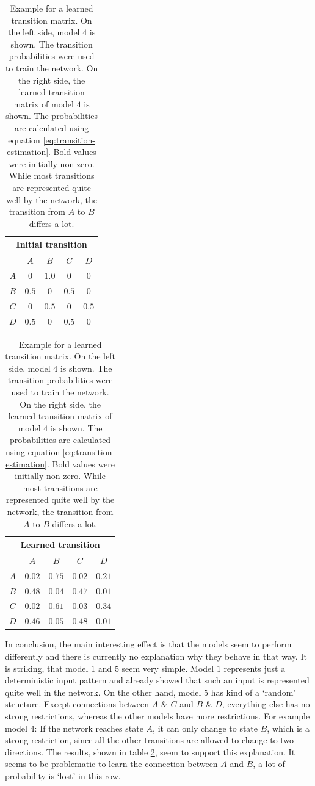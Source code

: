 \begin{table}[!b]
\centering
\begin{tabular}{ccccc}
\multicolumn{5}{c}{Initial transition} \\
\hline
& $A$ & $B$ & $C$ & $D$\\
$A$ & $0$ & $1.0$ & $0$ & $0$ \\
$B$ & $0.5$ & $0$ & $0.5$ & $0$ \\
$C$ & $0$ & $0.5$ & $0$ & $0.5$ \\
$D$ & $0.5$ & $0$ & $0.5$ & $0$
\end{tabular}
\qquad
\begin{tabular}{ccccc}
\multicolumn{5}{c}{Learned transition} \\
\hline
& $A$ & $B$ & $C$ & $D$\\
$A$ & $0.02$ & $\mathbf{0.75}$ & $0.02$ & $0.21$ \\
$B$ & $\mathbf{0.48}$ & $0.04$ & $\mathbf{0.47}$ & $0.01$ \\
$C$ & $0.02$ & $\mathbf{0.61}$ & $0.03$ & $\mathbf{0.34}$ \\
$D$ & $\mathbf{0.46}$ & $0.05$ & $\mathbf{0.48}$ & $0.01$
\end{tabular}
\vspace{5pt}
\caption[Example for a learned transition matrix]{Example for a learned transition matrix. On the left side, model $4$ is shown. The transition probabilities were used to train the network. On the right side, the learned transition matrix of model $4$ is shown. The probabilities are calculated using equation \eqref{eq:transition-estimation}. Bold values were initially non-zero. While most transitions are represented quite well by the network, the transition from $A$ to $B$ differs a lot.}
\label{tb:mc1-example}
\end{table}

In conclusion, the main interesting effect is that the models seem to perform differently and there is currently no explanation why they behave in that way. It is striking, that model $1$ and $5$ seem very simple. Model $1$ represents just a deterministic input pattern and \textcite{hartmann2015s} already showed that such an input is represented quite well in the network. On the other hand, model $5$ has kind of a `random' structure. Except connections between $A$ \& $C$ and $B$ \& $D$, everything else has no strong restrictions, whereas the other models have more restrictions. For example model $4$: If the network reaches state $A$, it can only change to state $B$, which is a strong restriction, since all the other transitions are allowed to change to two directions. The results, shown in table \ref{tb:mc1-example}, seem to support this explanation. It seems to be problematic to learn the connection between $A$ and $B$, a lot of probability is `lost' in this row.

